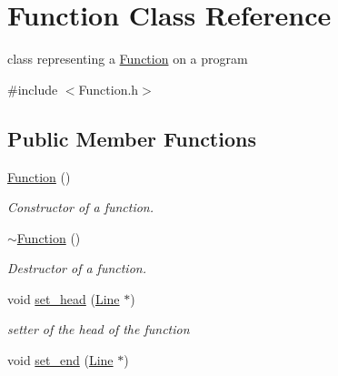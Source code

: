 \hypertarget{class_function}{\section{Function Class Reference}
\label{class_function}
}


class representing a \hyperlink{class_function}{Function} on a program  




{\ttfamily \#include $<$Function.\+h$>$}

\subsection*{Public Member Functions}
\begin{DoxyCompactItemize}
\item 
\hypertarget{class_function_ae206568fd4fd4c885e3ccff76345c4e6}{\hyperlink{class_function_ae206568fd4fd4c885e3ccff76345c4e6}{Function} ()}\label{class_function_ae206568fd4fd4c885e3ccff76345c4e6}

\begin{DoxyCompactList}\small\item\em Constructor of a function. \end{DoxyCompactList}\item 
\hypertarget{class_function_a3b03f7cf0b75d16edebdda1dee1db6fd}{\hyperlink{class_function_a3b03f7cf0b75d16edebdda1dee1db6fd}{$\sim$\+Function} ()}\label{class_function_a3b03f7cf0b75d16edebdda1dee1db6fd}

\begin{DoxyCompactList}\small\item\em Destructor of a function. \end{DoxyCompactList}\item 
\hypertarget{class_function_a67ffa7175c8ab513df6db299b877ad97}{void \hyperlink{class_function_a67ffa7175c8ab513df6db299b877ad97}{set\+\_\+head} (\hyperlink{class_line}{Line} $\ast$)}\label{class_function_a67ffa7175c8ab513df6db299b877ad97}

\begin{DoxyCompactList}\small\item\em setter of the head of the function \end{DoxyCompactList}\item 
\hypertarget{class_function_af5b88d118098c4cd6e5e3a4d324b8b48}{void \hyperlink{class_function_af5b88d118098c4cd6e5e3a4d324b8b48}{set\+\_\+end} (\hyperlink{class_line}{Line} $\ast$)}\label{class_function_af5b88d118098c4cd6e5e3a4d324b8b48}


\end{DoxyCompactItemize}

